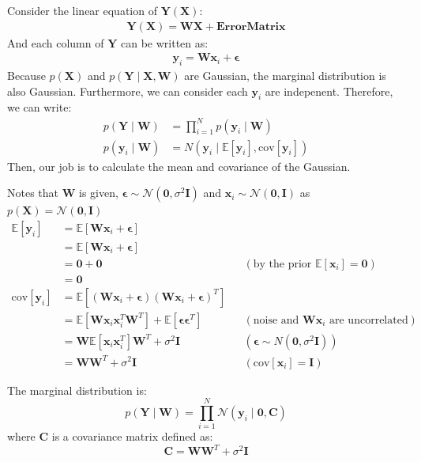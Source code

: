 \documentclass[12pt]{article}
\newenvironment{question}[2][Question]{\begin{trivlist}
\kern10pt
\item[\hskip \labelsep {\bfseries #1}\hskip \labelsep {\bfseries #2.}]}{\end{trivlist}}
\begin{document}
\begin{question}{13}
Consider the linear equation of $\mathbf{Y}(\mathbf{X})$:
  \begin{align*}
    \mathbf{Y}(\mathbf{X}) = \mathbf{W}\mathbf{X} + \bm{ErrorMatrix}
  \end{align*}
And each column of $\mathbf{Y}$ can be written as:
\begin{align*}
  \mathbf{y}_i = \mathbf{W}\mathbf{x}_i + \bm{\epsilon}
\end{align*}
Because $p(\mathbf{X})$ and $p(\mathbf{Y}\mid\mathbf{X}, \mathbf{W})$ are Gaussian, 
 the marginal distribution is also Gaussian.
 Furthermore, we can consider each $\mathbf{y}_i$ are indepenent. Therefore, 
 we can write:
\begin{align*}
  p(\mathbf{Y}\mid\mathbf{W}) &= \prod_{i=1}^{N} p(\mathbf{y}_i\mid\mathbf{W}) \\
  p(\mathbf{y}_i\mid\mathbf{W}) &= N(\mathbf{y}_i\mid \mathbb{E}[\mathbf{y}_i], \text{cov}[\mathbf{y}_i])
\end{align*}
Then, our job is to calculate the mean and covariance of the Gaussian.

Notes that $\mathbf{W}$ is given, $\bm{\epsilon} \sim \mathcal{N}(\mathbf{0}, \sigma^2\mathbf{I})$
 and $\mathbf{x}_i \sim \mathcal{N}(\mathbf{0}, \mathbf{I})$ as 
 $p(\mathbf{X}) = \mathcal{N}(\mathbf{0}, \mathbf{I})$
\begin{align*}
  \mathbb{E}[\mathbf{y}_i] &= \mathbb{E}[\mathbf{W}\mathbf{x}_i + \bm{\epsilon}] \\ 
  &= \mathbb{E}[\mathbf{W}\mathbf{x}_i + \bm{\epsilon}] \\
  &= \mathbf{0} + \mathbf{0} 
                      && (\text{by the prior }\mathbb{E}[\mathbf{x}_i] = \mathbf{0})\\
  &= \mathbf{0} \\
  \text{cov}[\mathbf{y}_i] 
  &= \mathbb{E}[(\mathbf{W}\mathbf{x}_i + \bm{\epsilon})
                (\mathbf{W}\mathbf{x}_i + \bm{\epsilon})^{T}] \\
  &= \mathbb{E}[\mathbf{W}\mathbf{x}_i\mathbf{x}_i^T\mathbf{W}^T]
     + \mathbb{E}[\bm{\epsilon}\bm{\epsilon}^{T}]
     && (\text{noise and }\mathbf{W}\mathbf{x}_i\text{ are uncorrelated}) \\
  &= \mathbf{W}\mathbb{E}[\mathbf{x}_i\mathbf{x}_i^T]\mathbf{W}^T + \sigma^2 \mathbf{I}
     && (\bm{\epsilon} \sim N(\mathbf{0}, \sigma^2\mathbf{I})) \\
  &= \mathbf{W}\mathbf{W}^T + \sigma^2\mathbf{I}
     && (\text{cov}[\mathbf{x}_i] = \mathbf{I})
\end{align*}

The marginal distribution is:
\begin{equation}\label{eq:q13-result}
  p(\mathbf{Y}\mid\mathbf{W}) 
  = \prod_{i=1}^{N} 
    \mathcal{N}(\mathbf{y}_i\mid\mathbf{0}, \mathbf{C})
\end{equation}
where $\mathbf{C}$ is a covariance matrix defined as:
\begin{equation}\label{eq:q13-matC}
  \mathbf{C} = \mathbf{W}\mathbf{W}^T + \sigma^2\mathbf{I}
\end{equation}
\end{question}
\end{document}
